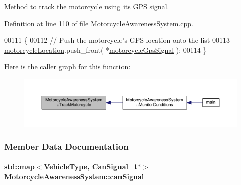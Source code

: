Method to track the motorcycle using its G\-P\-S signal. 



Definition at line \hyperlink{MotorcycleAwarenessSystem_8cpp_source_l00110}{110} of file \hyperlink{MotorcycleAwarenessSystem_8cpp_source}{Motorcycle\-Awareness\-System.\-cpp}.


\begin{DoxyCode}
00111 \{
00112     \textcolor{comment}{// Push the motorcycle's GPS location onto the list}
00113     \hyperlink{classMotorcycleAwarenessSystem_af6becfeb1d11b467cb80a94a8e6940ac}{motorcycleLocation}.push\_front( *\hyperlink{classMotorcycleAwarenessSystem_ab281a3993b574923b2f379ed0477b2d4}{motorcycleGpsSignal} );
00114 \}
\end{DoxyCode}


Here is the caller graph for this function\-:\nopagebreak
\begin{figure}[H]
\begin{center}
\leavevmode
\includegraphics[width=350pt]{classMotorcycleAwarenessSystem_a4e6eec23ec46e24ee377a3c94e15eba4_icgraph}
\end{center}
\end{figure}




\subsubsection{Member Data Documentation}
\hypertarget{classMotorcycleAwarenessSystem_a2d8ac602ae24dcf38aaa95a42ffb4e1f}{
\paragraph[{can\-Signal}]{\setlength{\rightskip}{0pt plus 5cm}std\-::map$<${\bf Vehicle\-Type}, {\bf Can\-Signal\-\_\-t}$\ast$$>$ Motorcycle\-Awareness\-System\-::can\-Signal\hspace{0.3cm}{\ttfamily [private]}}}\label{classMotorcycleAwarenessSystem_a2d8ac602ae24dcf38aaa95a42ffb4e1f}


